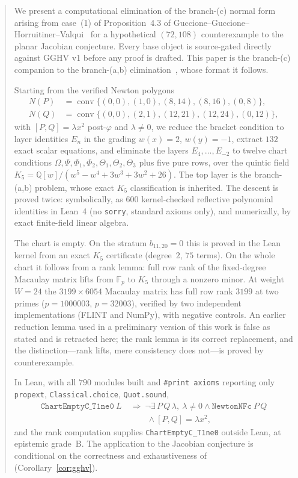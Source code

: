 \documentclass[a4paper,11pt]{article}
\theoremstyle{plain}
\theoremstyle{definition}
\theoremstyle{remark}
\begin{document}
\begin{abstract}
We present a computational elimination of the branch-(c) normal form arising from case~(1) of Proposition~4.3 of Guccione--Guccione--Horruitiner--Valqui~\cite{GGHV} for a hypothetical $(72,108)$ counterexample to the planar Jacobian conjecture. Every base object is source-gated directly against GGHV v1 before any proof is drafted. This paper is the branch-(c) companion to the branch-(a,b) elimination~\cite{BranchABv19}, whose format it follows.

Starting from the verified Newton polygons
\[
\begin{aligned}
N(P)&=\operatorname{conv}\{(0,0),(1,0),(8,14),(8,16),(0,8)\},\\
N(Q)&=\operatorname{conv}\{(0,0),(2,1),(12,21),(12,24),(0,12)\},
\end{aligned}
\]
with $[P,Q]=\lambda x^2$ post-$\varphi$ and $\lambda\ne0$, we reduce the bracket condition to layer identities $E_n$ in the grading $w(x)=2$, $w(y)=-1$, extract $132$ exact scalar equations, and eliminate the layers $E_4,\dots,E_{-2}$ to twelve chart conditions $\Omega,\Psi,\Phi_1,\Phi_2,\Theta_1,\Theta_2,\Theta_3$ plus five pure rows, over the quintic field $K_5=\mathbb{Q}[w]/(w^5-w^4+3w^3+3w^2+26)$. The top layer is the branch-(a,b) problem, whose exact $K_5$ classification is inherited. The descent is proved twice: symbolically, as $600$ kernel-checked reflective polynomial identities in Lean~4 (no \texttt{sorry}, standard axioms only), and numerically, by exact finite-field linear algebra.

The chart is empty. On the stratum $b_{11,20}=0$ this is proved in the Lean kernel from an exact $K_5$ certificate (degree~$2$, $75$ terms). On the whole chart it follows from a rank lemma: full row rank of the fixed-degree Macaulay matrix lifts from $\mathbb{F}_p$ to $K_5$ through a nonzero minor. At weight $W=24$ the $3199\times 6054$ Macaulay matrix has full row rank $3199$ at two primes ($p=1000003$, $p=32003$), verified by two independent implementations (FLINT and NumPy), with negative controls. An earlier reduction lemma used in a preliminary version of this work is false as stated and is retracted here; the rank lemma is its correct replacement, and the distinction---rank lifts, mere consistency does not---is proved by counterexample.

In Lean, with all $790$ modules built and \texttt{\#print axioms} reporting only \texttt{propext}, \texttt{Classical.choice}, \texttt{Quot.sound},
\[
\begin{aligned}
\texttt{ChartEmptyC\_T1ne0}\ L\ &\Rightarrow\
\lnot\exists\,P\,Q\,\lambda,\ \lambda\ne0\land\texttt{NewtonNFc}\ P\,Q \\
&\qquad\land[P,Q]=\lambda x^2,
\end{aligned}
\]
and the rank computation supplies \texttt{ChartEmptyC\_T1ne0} outside Lean, at epistemic grade~B. The application to the Jacobian conjecture is conditional on the correctness and exhaustiveness of~\cite[Proposition~4.3]{GGHV} (Corollary~\ref{cor:gghv}).
\end{abstract}
\end{document}
